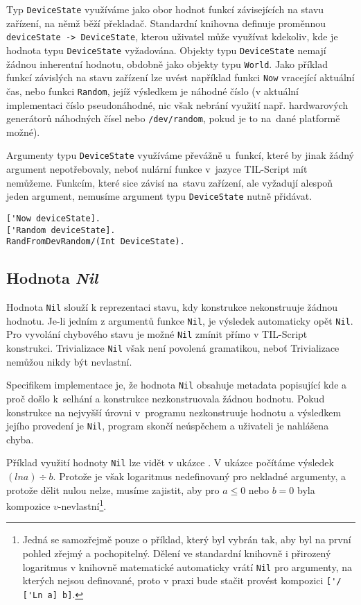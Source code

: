Typ \lstinline{DeviceState} využíváme jako obor hodnot funkcí závisejících na stavu zařízení,
na němž běží překladač. Standardní knihovna definuje proměnnou
\lstinline{deviceState -> DeviceState}, kterou uživatel může využívat kdekoliv, kde je hodnota typu
\lstinline{DeviceState} vyžadována. Objekty typu \lstinline{DeviceState} nemají žádnou inherentní
hodnotu, obdobně jako objekty typu \lstinline{World}. Jako příklad funkcí závislých na stavu
zařízení lze uvést například funkci \lstinline{Now} vracející aktuální čas, nebo funkci
\lstinline{Random}, jejíž výsledkem je náhodné číslo (v aktuální implementaci číslo pseudonáhodné,
nic však nebrání využití např. hardwarových generátorů náhodných čísel nebo
\lstinline{/dev/random}, pokud je to na~dané platformě možné).

Argumenty typu \lstinline{DeviceState} využíváme převážně u~funkcí, které by jinak žádný argument
nepotřebovaly, neboť nulární funkce v~jazyce TIL-Script mít nemůžeme. Funkcím, které sice
závisí na~stavu zařízení, ale vyžadují alespoň jeden argument, nemusíme argument typu
\lstinline{DeviceState} nutně přidávat.

\begin{lstlisting}[caption={Příklad funkcí závislých na stavu zařízení}]
['Now deviceState].
['Random deviceState].
RandFromDevRandom/(Int DeviceState).
\end{lstlisting}

\subsection{Hodnota \textit{Nil}}\label{nil-value}

Hodnota \lstinline{Nil} slouží k reprezentaci stavu, kdy konstrukce nekonstruuje žádnou hodnotu.
Je-li jedním z argumentů funkce \lstinline{Nil}, je výsledek automaticky opět \lstinline{Nil}.
Pro vyvolání chybového stavu je možné \lstinline{Nil} zmínit přímo v TIL-Script konstrukci.
Trivializace \lstinline{Nil} však není povolená gramatikou, neboť Trivializace nemůžou nikdy
být nevlastní\cite{til-duzi}.

Specifikem implementace je, že hodnota \lstinline{Nil} obsahuje metadata popisující kde a proč
došlo k~selhání a konstrukce nezkonstruovala žádnou hodnotu. Pokud konstrukce na nejvyšší úrovni
v~programu nezkonstruuje hodnotu a výsledkem jejího provedení je \lstinline{Nil}, program skončí
neúspěchem a uživateli je nahlášena chyba.

Příklad využití hodnoty \lstinline{Nil} lze vidět v ukázce . V ukázce počítáme
výsledek $(ln a) \div b$. Protože je však logaritmus nedefinovaný pro nekladné argumenty, a protože
dělit nulou nelze, musíme zajistit, aby pro $a \le 0$ nebo $b = 0$ byla kompozice
$v$-nevlastní\footnote{
  Jedná se samozřejmě pouze o příklad, který byl vybrán tak, aby byl na první pohled zřejmý
  a pochopitelný. Dělení ve standardní knihovně i přirozený logaritmus v knihovně matematické
  automaticky vrátí \lstinline{Nil} pro argumenty, na kterých nejsou definované, proto v praxi bude
  stačit provést kompozici \lstinline{['/ ['Ln a] b]}.
}.

